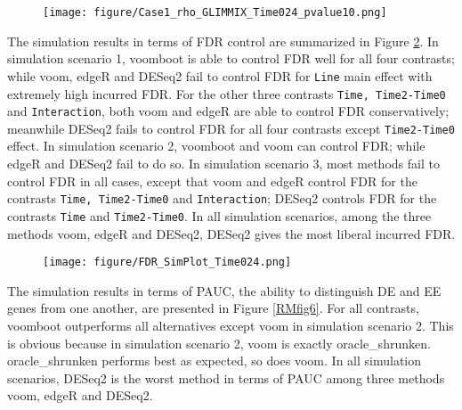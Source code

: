 \begin{figure}[!htbp]
\centering
\texttt{[image: figure/Case1\_rho\_GLIMMIX\_Time024\_pvalue10.png]}
       \label{RMfig10}
\end{figure}


The simulation results in terms of FDR control are summarized in  Figure \ref{RMfig5}. In  simulation scenario 1, voomboot is able to control FDR well for all four contrasts; while voom, edgeR and DESeq2 fail to control FDR for \texttt{Line} main effect with extremely high incurred FDR. For the other three contrasts \texttt{Time, Time2-Time0} and \texttt{Interaction}, both voom and edgeR are able to control FDR conservatively; meanwhile DESeq2 fails to control FDR for all four contrasts except  \texttt{Time2-Time0} effect. In  simulation scenario 2, voomboot and  voom can control FDR; while edgeR and DESeq2 fail to do so. In  simulation scenario 3, most methods fail to control FDR in all cases, except that voom and edgeR  control FDR for the contrasts \texttt{Time, Time2-Time0} and \texttt{Interaction}; DESeq2 controls FDR for the contrasts \texttt{Time} and \texttt{Time2-Time0}. In all simulation scenarios, among the three methods voom, edgeR and  DESeq2,  DESeq2 gives the most liberal incurred FDR.


\begin{figure}[!htbp]
\centering
\texttt{[image: figure/FDR\_SimPlot\_Time024.png]}
       \label{RMfig5}
\end{figure}


The simulation results in terms of PAUC, the ability to distinguish DE and EE genes from one another, are presented in Figure \ref{RMfig6}. For all contrasts, voomboot outperforms all alternatives  except voom in  simulation scenario 2. This is obvious because in  simulation scenario 2, voom is exactly  oracle\_shrunken.  oracle\_shrunken performs best as expected, so does voom. In all simulation scenarios, DESeq2 is the worst method in terms of PAUC among three methods voom, edgeR and DESeq2.

